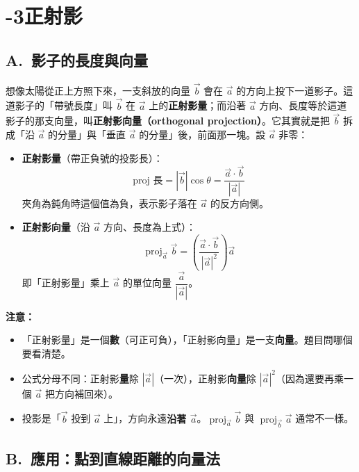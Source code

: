 \documentclass[11pt]{article}
\begin{document}
\section*{-3\quad 正射影}

\subsection*{\sffamily A.\ 影子的長度與向量}

想像太陽從正上方照下來，一支斜放的向量 $\vec b$ 會在 $\vec a$ 的方向上投下一道影子。這道影子的「帶號長度」叫 $\vec b$ 在 $\vec a$ 上的\textbf{正射影量}；而沿著 $\vec a$ 方向、長度等於這道影子的那支向量，叫\textbf{正射影向量（orthogonal projection）}。它其實就是把 $\vec b$ 拆成「沿 $\vec a$ 的分量」與「垂直 $\vec a$ 的分量」後，前面那一塊。設 $\vec a$ 非零：

\begin{itemize}\setlength{\itemsep}{2pt}
\item \textbf{正射影量}（帶正負號的投影長）：
$$\boxed{\;\text{proj 長}=|\vec b|\cos\theta=\frac{\vec a\cdot\vec b}{|\vec a|}\;}$$
夾角為鈍角時這個值為負，表示影子落在 $\vec a$ 的反方向側。
\item \textbf{正射影向量}（沿 $\vec a$ 方向、長度為上式）：
$$\boxed{\;\operatorname{proj}_{\vec a}\vec b=\left(\frac{\vec a\cdot\vec b}{|\vec a|^2}\right)\vec a\;}$$
即「正射影量」乘上 $\vec a$ 的單位向量 $\dfrac{\vec a}{|\vec a|}$。
\end{itemize}


\textbf{注意：}
\begin{itemize}\setlength{\itemsep}{1pt}
\item 「正射影量」是一個\textbf{數}（可正可負），「正射影向量」是一支\textbf{向量}。題目問哪個要看清楚。
\item 公式分母不同：正射影\textbf{量}除 $|\vec a|$（一次），正射影\textbf{向量}除 $|\vec a|^2$（因為還要再乘一個 $\vec a$ 把方向補回來）。
\item 投影是「$\vec b$ 投到 $\vec a$ 上」，方向永遠\textbf{沿著 $\vec a$}。$\operatorname{proj}_{\vec a}\vec b$ 與 $\operatorname{proj}_{\vec b}\vec a$ 通常不一樣。
\end{itemize}

\subsection*{\sffamily B.\ 應用：點到直線距離的向量法}
\end{document}
